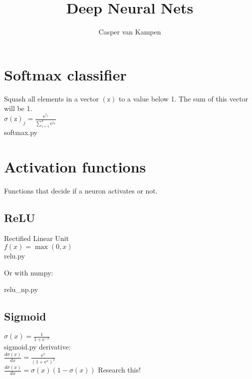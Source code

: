 \documentclass[11pt,a4paper]{article}
\begin{document}
\title{Deep Neural Nets}

\author{Casper van Kampen}
\date{}

\maketitle
\newpage
\tableofcontents
\newpage



\section{Softmax classifier}

Squash all elements in a vector $(\mathrm{z})$ to a value below 1. The sum of this vector will be 1.
\\[11pt]
$\sigma{(\mathrm{z})}_j = \frac{\mathrm{e}^{z_j}}{\sum_{i=1}^{k} \mathrm{e}^{z_k}}$
\\

{softmax.py}

\newpage
\section{Activation functions}

Functions that decide if a neuron activates or not.

\subsection{ReLU}

Rectified Linear Unit
\\[11pt]
$f(x) = \max(0,x)$
\\

{relu.py}

Or with numpy:


{relu_np.py}

\subsection{Sigmoid}

$\sigma(x) = \frac{1}{1 + \mathrm{e}^{-x}}$
\\

{sigmoid.py}
derivative:\\[11pt]
$\frac{d\sigma(x)}{dx} = \frac{\mathrm{e}^{x}}{{(1 + \mathrm{e}^{x})}^2}$
\\[11pt]
$\frac{d\sigma(x)}{dx} = \sigma(x) (1 - \sigma(x))$
Research this!
\end{document}
